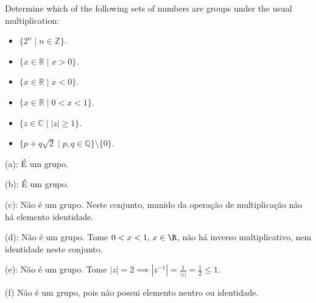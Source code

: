 \begin{exercicio}{1.56}
	Determine which of the following sets of numbers are groups under the usual multiplication:

	\begin{itemize}
		\item[(a)] $\{ 2^n \mid n \in \mathbb{Z} \}$.
		\item[(b)] $\{ x \in \mathbb{R} \mid x > 0 \}$.
		\item[(c)] $\{ x \in \mathbb{R} \mid x < 0 \}$.
		\item[(d)] $\{ x \in \mathbb{R} \mid 0 < x < 1 \}$.
		\item[(e)] $\{ z \in \mathbb{C} \mid |z| \geq 1 \}$.	
		\item[(f)] $\{ p + q \sqrt{2} \mid p, q \in \mathbb{Q} \} \setminus \{0\}$.
	\end{itemize}
\end{exercicio}

\begin{solucao}
	(a): É um grupo.

	(b): É um grupo.

	(c): Não é um grupo. Neste conjunto, munido da operação de multiplicação não há elemento identidade.

	(d): Não é um grupo. Tome \(0 < x < 1, \, x \in \R\), não há inverso multiplicativo, nem identidade neste conjunto.

	(e): Não é um grupo. Tome \(|z| = 2 \implies |z^{-1}| = \frac{1}{|z|} = \frac{1}{2} \leq 1\).

	(f) Não é um grupo, pois não possui elemento neutro ou identidade.
\end{solucao}